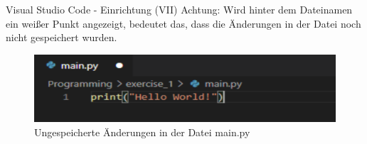     \begin{frame}{Visual Studio Code - Einrichtung (VII)}
        Achtung: Wird hinter dem Dateinamen ein weißer Punkt angezeigt, bedeutet das, dass die Änderungen in der Datei noch nicht gespeichert wurden.
        
        \begin{figure}
            \centering
            \includegraphics[keepaspectratio, width=0.9\linewidth]{chapters/08_ide/figures/vs_code_not_saved.png}
            \caption{Ungespeicherte Änderungen in der Datei main.py}
        \end{figure}
        
    \end{frame}